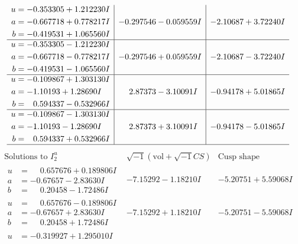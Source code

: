 \documentclass[1p]{elsarticle_modified}
\theoremstyle{definition}
\newcommand{\I}{\sqrt{-1}}
\begin{document}
$$\begin{array}{c|c|c}
\begin{aligned}
u &= -0.353305 + 1.212230 I \\
a &= -0.667718 + 0.778217 I \\
b &= -0.419531 + 1.065560 I\end{aligned}
 & -0.297546 - 0.059559 I & -2.10687 + 3.72240 I \\ \hline\begin{aligned}
u &= -0.353305 - 1.212230 I \\
a &= -0.667718 - 0.778217 I \\
b &= -0.419531 - 1.065560 I\end{aligned}
 & -0.297546 + 0.059559 I & -2.10687 - 3.72240 I \\ \hline\begin{aligned}
u &= -0.109867 + 1.303130 I \\
a &= -1.10193 + 1.28690 I \\
b &= \phantom{-}0.594337 - 0.532966 I\end{aligned}
 & \phantom{-}2.87373 - 3.10091 I & -0.94178 + 5.01865 I \\ \hline\begin{aligned}
u &= -0.109867 - 1.303130 I \\
a &= -1.10193 - 1.28690 I \\
b &= \phantom{-}0.594337 + 0.532966 I\end{aligned}
 & \phantom{-}2.87373 + 3.10091 I & -0.94178 - 5.01865 I\\
 \hline 
 \end{array}$$\newpage$$\begin{array}{c|c|c}  
\text{Solutions to }I^u_{2}& \I (\text{vol} + \sqrt{-1}CS) & \text{Cusp shape}\\
 \hline 
\begin{aligned}
u &= \phantom{-}0.657676 + 0.189806 I \\
a &= -0.67657 - 2.83630 I \\
b &= \phantom{-}0.20458 - 1.72486 I\end{aligned}
 & -7.15292 - 1.18210 I & -5.20751 + 5.59068 I \\ \hline\begin{aligned}
u &= \phantom{-}0.657676 - 0.189806 I \\
a &= -0.67657 + 2.83630 I \\
b &= \phantom{-}0.20458 + 1.72486 I\end{aligned}
 & -7.15292 + 1.18210 I & -5.20751 - 5.59068 I \\ \hline\begin{aligned}
u &= -0.319927 + 1.295010 I \\

\end{aligned}
\end{array}$$
\end{document}
